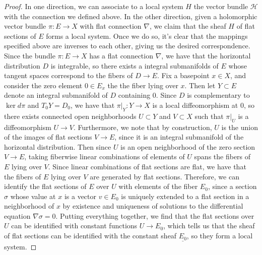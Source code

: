 \documentclass[psamsfonts, 12pt]{amsart}
\theoremstyle{definition}
\theoremstyle{remark}
\begin{document}
\begin{proof}
In one direction, we can associate to a local system $H$ the vector bundle
$\mathcal{H}$ with the connection we defined above. In the
other direction, given a holomorphic vector bundle $\pi : E \to X$ with flat connection
$\nabla$, we claim that the sheaf $H$ of flat sections of $E$ forms a local system.
Once we do so, it's clear that the mappings specified above are inverses to
each other, giving us the desired correspondence. \\

Since the bundle $\pi : E \to X$ has a flat connection $\nabla$, we have that the
horizontal distribution $D$ is integrable, so there exists a integral
submanifolds of $E$ whose tangent spaces correspond to the fibers of $D \to E$.
Fix a basepoint $x \in X$, and consider the zero element $0 \in E_x$ the the fiber
lying over $x$. Then let $Y \subset E$ denote an integral submanifold of $D$ containing
$0$. Since $D$ is complementary to $\ker d\pi$ and $T_0Y = D_0$, we have that
$\pi\vert_Y : Y \to X$ is a local diffeomorphism at $0$, so there exists connected
open neighborhoods $U \subset Y$ and $V \subset X$ such that $\pi\vert_U$ is a
diffeomorphism $U \to V$. Furthermore, we note that by construction, $U$ is the union of
the images of flat sections $V \to E$, since it is an integral submanifold of the
horizontal distribution. Then since $U$ is an open neighborhood of the
zero section $V \to E$, taking fiberwise linear combinations of elements
of $U$ spans the fibers of $E$ lying over $V$. Since linear combinations of flat
sections are flat, we have that the fibers of $E$ lying over $V$ are generated by flat
sections. Therefore, we can identify the flat sections of $E$ over $U$ with elements
of the fiber $E_0$, since a section $\sigma$ whose value at $x$ is a vector
$v \in E_0$ is uniquely extended to a flat section in a neighborhood of $x$
by existence and uniqueness of solutions to the differential equation $\nabla\sigma = 0$.
Putting everything together, we find that the flat sections over $U$ can be
identified with constant functions $U \to E_0$, which tells us that the sheaf
of flat sections can be identified with the constant sheaf $\underline{E_0}$, so
they form a local system.
\end{proof}
%
\end{document}
